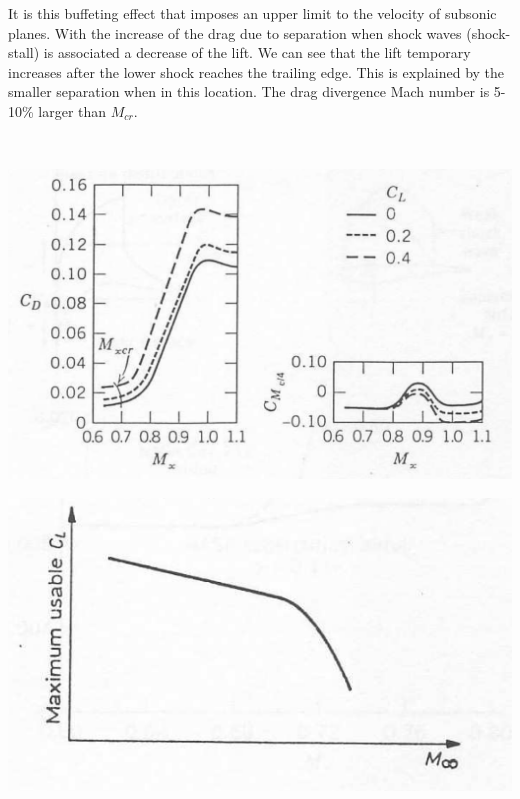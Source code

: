 	It is this buffeting effect that imposes an upper limit to the velocity of subsonic planes. With the increase of the drag due to separation when shock waves (shock-stall) is associated a decrease of the lift. We can see that the lift temporary increases after the lower shock reaches the trailing edge. This is explained by the smaller separation when in this location. The drag divergence Mach number is 5-10\% larger than $M_{cr}$. 
	
	\ \\
	
	\begin{center}
	\begin{minipage}{0.4\textwidth}
	\includegraphics[scale=0.3]{ch6/5}
	\label{fig:6.5}
	\end{minipage}
	\begin{minipage}{0.4\textwidth}
	\includegraphics[scale=0.6]{ch6/6}
	\label{fig:6.6}
	\end{minipage}
	\end{center}

